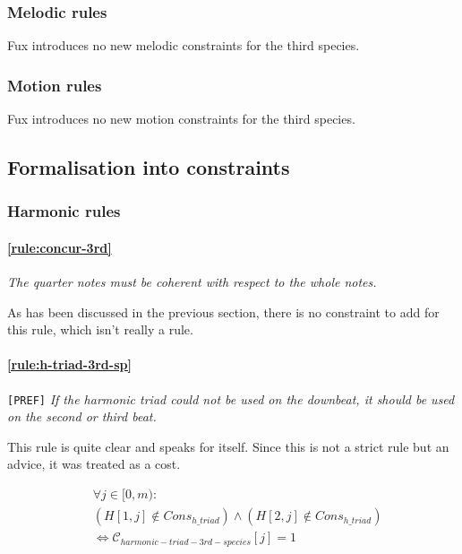 \subsubsection{Melodic rules}
Fux introduces no new melodic constraints for the third species.
\subsubsection{Motion rules}
Fux introduces no new motion constraints for the third species.

\subsection{Formalisation into constraints}
\subsubsection{Harmonic rules}
\paragraph{\hspace{.5cm}\ref{rule:concur-3rd}} \textit{The quarter notes must be coherent with respect to the whole notes.}

As has been discussed in the previous section, there is no constraint to add for this rule, which isn't really a rule.

\paragraph{\hspace{.6cm}\ref{rule:h-triad-3rd-sp}} \texttt{[PREF]} \textit{If the harmonic triad could not be used on the downbeat, it should be used on the second or third beat.}    

    This rule is quite clear and speaks for itself. Since this is not a strict rule but an advice, it was treated as a cost.

    \begin{equation} \begin{aligned}
            &\forall j \in [0, m) \colon \\
            &(H[1, j] \notin Cons_{h\_triad}) \land  (H[2, j] \notin Cons_{h\_triad})\\
            &\iff \mathcal{C}_{harmonic-triad-3rd-species}[j] = 1       
    \end{aligned} \end{equation}




